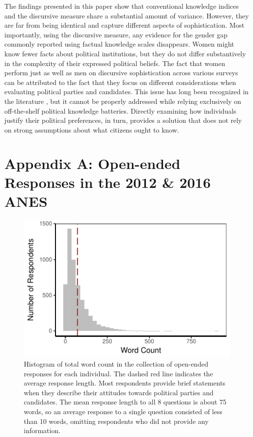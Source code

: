 \documentclass[12pt]{article}
\begin{document}
The findings presented in this paper show that conventional knowledge indices and the discursive measure share a substantial amount of variance. However, they are far from being identical and capture different aspects of sophistication. Most importantly, using the discursive measure, any evidence for the gender gap commonly reported using factual knowledge scales disappears. Women might know fewer facts about political institutions, but they do not differ substantively in the complexity of their expressed political beliefs. The fact that women perform just as well as men on discursive sophistication across various surveys can be attributed to the fact that they focus on different considerations when evaluating political parties and candidates. This issue has long been recognized in the literature \citep[e.g.,][]{graber2001processing,dolan2011women}, but it cannot be properly addressed while relying exclusively on off-the-shelf political knowledge batteries. Directly examining how individuals justify their political preferences, in turn, provides a solution that does not rely on strong assumptions about what citizens ought to know.

\singlespacing



\clearpage
\section*{Appendix A: Open-ended Responses in the 2012 \& 2016 ANES}
\renewcommand\thefigure{A.\arabic{figure}}
\renewcommand\thetable{A.\arabic{table}}
\setcounter{figure}{0}
\setcounter{table}{0}

\begin{figure}[h]\centering
\includegraphics{../fig/wc.pdf}
\caption{Histogram of total word count in the collection of open-ended responses for each individual. The dashed red line indicates the average response length. Most respondents provide brief statements when they describe their attitudes towards political parties and candidates. The mean response length to all 8 questions is about 75 words, so an average response to a single question consisted of less than 10 words, omitting respondents who did not provide any information.}\label{fig:wc}
\end{figure}
\end{document}
